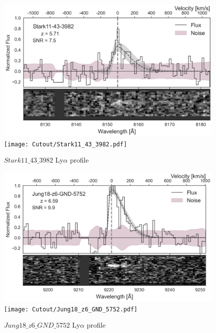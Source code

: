 \documentclass[12pt,english]{article}
\begin{document}
\begin{figure}
\begin{center}\includegraphics[width=12cm, trim=0.1cm 0cm 0cm -1cm]{LyaProfiles/Stark11_43_3982.png}
\texttt{[image: Cutout/Stark11\_43\_3982.pdf]}
\caption{$Stark11\_43\_3982$ Ly$\alpha$ profile}
\end{center}
\end{figure}
\clearpage
\begin{figure}
\begin{center}\includegraphics[width=12cm, trim=0.1cm 0cm 0cm -1cm]{LyaProfiles/Jung18_z6_GND_5752.png}
\texttt{[image: Cutout/Jung18\_z6\_GND\_5752.pdf]}
\caption{$Jung18\_z6\_GND\_5752$ Ly$\alpha$ profile}
\end{center}
\end{figure}
\clearpage
\end{document}
